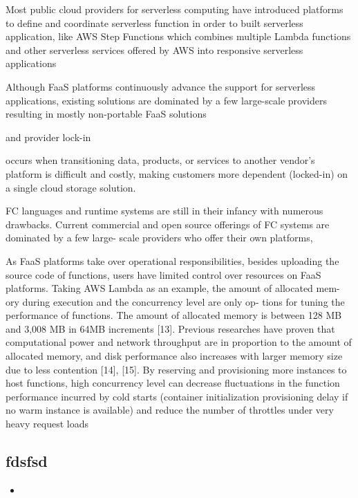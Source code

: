 \documentclass[10pt,a4paper]{report}
\theoremstyle{definition}
\begin{document}
Most public cloud providers for serverless computing have introduced platforms to define and coordinate serverless function in order to built serverless application, like AWS Step Functions which combines multiple Lambda functions and other serverless services offered by AWS into responsive serverless applications

Although FaaS platforms continuously advance the support for serverless applications, existing solutions are dominated by a few large-scale providers resulting in mostly non-portable FaaS solutions 

and provider lock-in

occurs when transitioning data, products, or services to another vendor's platform is difficult and costly, making customers more dependent (locked-in) on a single cloud storage solution.

FC languages and runtime systems are still in their
infancy with numerous drawbacks. Current commercial and open
source offerings of FC systems are dominated by a few large-
scale providers who offer their own platforms, 

As FaaS platforms take over operational responsibilities,
besides uploading the source code of functions, users have
limited control over resources on FaaS platforms. Taking
AWS Lambda as an example, the amount of allocated mem-
ory during execution and the concurrency level are only op-
tions for tuning the performance of functions. The amount
of allocated memory is between 128 MB and 3,008 MB
in 64MB increments [13]. Previous researches have proven
that computational power and network throughput are in
proportion to the amount of allocated memory, and disk
performance also increases with larger memory size due
to less contention [14], [15]. By reserving and provisioning
more instances to host functions, high concurrency level can
decrease ﬂuctuations in the function performance incurred
by cold starts (container initialization provisioning delay if
no warm instance is available) and reduce the number of
throttles under very heavy request loads



\subsection{fdsfsd}




\begin{itemize}
	\item 
\end{itemize}
\end{document}
